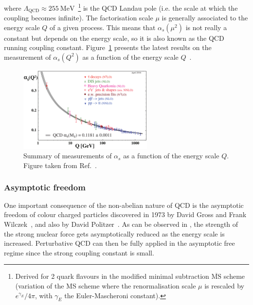 where $\Lambda_{\text{QCD}} \approx \SI{255}{\MeV}$~\cite{LambdaQCD}\footnote{Derived for 2 quark flavours in the modified minimal subtraction $\overline{\text{MS}}$ scheme (variation of the MS scheme where the renormalisation scale $\mu$ is rescaled by ${e^{\gamma_{E}}}/{4\pi}$, with $\gamma_{E}$ the Euler-Mascheroni constant).} is the QCD Landau pole (i.e. the scale at which the coupling becomes infinite). The factorisation scale $\mu$ is generally associated to the energy scale $Q$ of a given process. This means that $\alpha_{s}\left(\mu^{2}\right)$ is not really a constant but depends on the energy scale, so it is also known as the QCD running coupling constant. Figure~\ref{fig:Alphas} presents the latest results on the measurement of $\alpha_{s}\left(Q^{2}\right)$ as a function of the energy scale $Q$~\cite{PDG}.

\begin{figure}[htbp]
 \centering
 \includegraphics[width=0.6\textwidth]{Figures/Introduction/StandardModel/Alphas.png}
 \caption{Summary of measurements of $\alpha_{s}$ as a function of the energy scale $Q$. Figure taken from Ref.~\cite{PDG}.}
 \label{fig:Alphas}
\end{figure}

\subsubsection{Asymptotic freedom}

One important consequence of the non-abelian nature of QCD is the asymptotic freedom of colour charged particles discovered in 1973 by David Gross and Frank Wilczek~\cite{AsymptoticFreedom_1}, and also by David Politzer~\cite{AsymptoticFreedom_2}. As can be observed in , the strength of the strong nuclear force gets asymptotically reduced as the energy scale is increased. Perturbative QCD can then be fully applied in the asymptotic free regime since the strong coupling constant is small.

